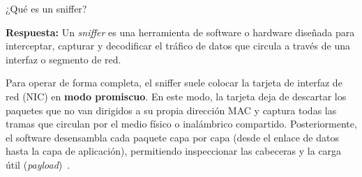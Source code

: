 ¿Qué es un sniffer?

\textbf{Respuesta:}
Un \textit{sniffer} es una herramienta de software o hardware diseñada para interceptar, capturar y decodificar el tráfico de datos que circula a través de una interfaz o segmento de red.

Para operar de forma completa, el sniffer suele colocar la tarjeta de interfaz de red (NIC) en \textbf{modo promiscuo}. En este modo, la tarjeta deja de descartar los paquetes que no van dirigidos a su propia dirección MAC y captura todas las tramas que circulan por el medio físico o inalámbrico compartido. Posteriormente, el software desensambla cada paquete capa por capa (desde el enlace de datos hasta la capa de aplicación), permitiendo inspeccionar las cabeceras y la carga útil (\textit{payload})~\cite{wireshark_guide}.


